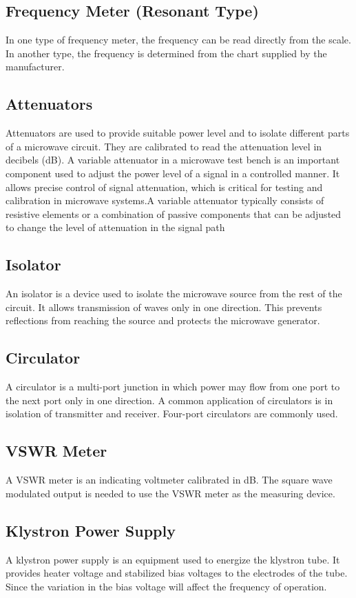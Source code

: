 \documentclass[11pt, a4paper]{article}
\begin{document}
\subsection{Frequency Meter (Resonant Type)}
In one type of frequency meter, the frequency can be read directly from the scale. In another type, the frequency
is determined from the chart supplied by the manufacturer.
\subsection{Attenuators}
Attenuators are used to provide suitable power level and to isolate different parts of a microwave circuit. They
are calibrated to read the attenuation level in decibels (dB). A variable attenuator in a microwave test bench is
an important component used to adjust the power level of a signal in a controlled manner. It allows precise control
of signal attenuation, which is critical for testing and calibration in microwave systems.A variable attenuator
typically consists of resistive elements or a combination of passive components that can be adjusted to change
the level of attenuation in the signal path
\subsection{Isolator}
An isolator is a device used to isolate the microwave source from the rest of the circuit. It allows transmission of
waves only in one direction. This prevents reflections from reaching the source and protects the microwave
generator.
\subsection{Circulator}
A circulator is a multi-port junction in which power may flow from one port to the next port only in one direction.
A common application of circulators is in isolation of transmitter and receiver. Four-port circulators are
commonly used.
\subsection{VSWR Meter}
A VSWR meter is an indicating voltmeter calibrated in dB. The square wave modulated output is needed to use
the VSWR meter as the measuring device.
\subsection{Klystron Power Supply}
A klystron power supply is an equipment used to energize the klystron tube. It provides heater voltage and
stabilized bias voltages to the electrodes of the tube. Since the variation in the bias voltage will affect the
frequency of operation.
\end{document}
